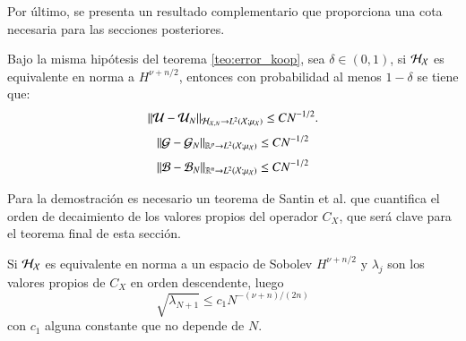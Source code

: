 Por último, se presenta un resultado complementario que proporciona una cota necesaria para las secciones posteriores.
\begin{teo}
    Bajo la misma hipótesis del teorema \ref{teo:error_koop}, sea $\delta \in (0, 1)$,  si $\mathcal{H}_{\mathcal{X}}$ es equivalente en norma a $H^{\nu + n/2}$, entonces con probabilidad al menos $1 - \delta$ se tiene que:
    \begin{equation}
        \| \mathcal{U} - \mathcal{U}_N \|_{\mathcal{H}_{\mathcal{X}, N} \to L^2(\mathcal{X}; \mu_{\mathcal{X}})} \leq C N^{-1/2}.
        \label{eq:kEDMD_bound}
    \end{equation}
    \begin{equation*}
    \| \mathcal{G} - \mathcal{G}_N \|_{\mathbb{R}^p \to L^2(\mathcal{X}; \mu_{\mathcal{X}})} \leq C N^{-1/2}
    \end{equation*}
    \begin{equation*}
    \| \mathcal{B} - \mathcal{B}_N \|_{\mathbb{R}^n \to L^2(\mathcal{X}; \mu_{\mathcal{X}})} \leq C N^{-1/2}
    \end{equation*}
    \label{teo:error_koop_sqrt_N}
\end{teo}
Para la demostración es necesario un teorema de Santin et al. que cuantifica el orden de decaimiento de los valores propios del operador $C_X$, que será clave para el teorema final de esta sección.
\begin{teo}
    Si $\mathcal{H}_{\mathcal{X}}$ es equivalente en norma a un espacio de Sobolev $H^{\nu + n/2}$ y $\lambda_j$ son los valores propios de $C_X$ en orden descendente, luego
    \begin{equation*}
        \sqrt{\lambda_{N+1}} \leq c_1 N^{-(\nu + n)/(2n)}
    \end{equation*}
    con $c_1$ alguna constante que no depende de $N$.
    \label{teo:eig_val_decay}
\end{teo}
